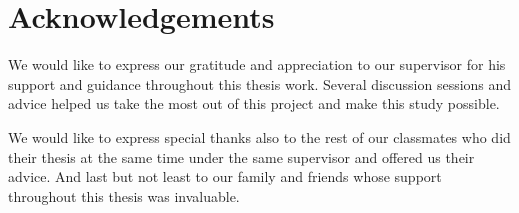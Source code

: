\chapter*{Acknowledgements} 
\mbox{}\par
We would like to express our gratitude and appreciation to our supervisor for his support and guidance throughout this thesis work.
Several discussion sessions and advice helped us take the most out of this project and make this study possible. 
\par
We would like to express special thanks also to the rest of our classmates who did their thesis at the same time under the same supervisor and offered us their advice. And last but not least to our family and friends whose support throughout this thesis was invaluable.  